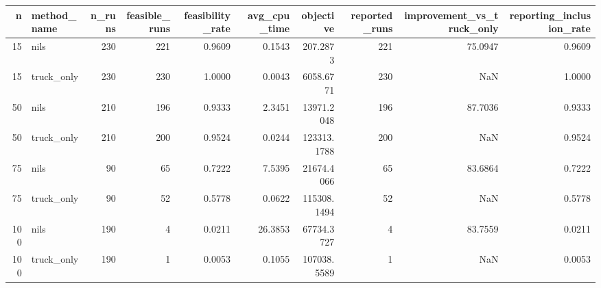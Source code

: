 \begin{tabular}{rlrrrrrrrr}
\toprule
n & method_name & n_runs & feasible_runs & feasibility_rate & avg_cpu_time & objective & reported_runs & improvement_vs_truck_only & reporting_inclusion_rate \\
\midrule
15 & nils & 230 & 221 & 0.9609 & 0.1543 & 207.2873 & 221 & 75.0947 & 0.9609 \\
15 & truck_only & 230 & 230 & 1.0000 & 0.0043 & 6058.6771 & 230 & NaN & 1.0000 \\
50 & nils & 210 & 196 & 0.9333 & 2.3451 & 13971.2048 & 196 & 87.7036 & 0.9333 \\
50 & truck_only & 210 & 200 & 0.9524 & 0.0244 & 123313.1788 & 200 & NaN & 0.9524 \\
75 & nils & 90 & 65 & 0.7222 & 7.5395 & 21674.4066 & 65 & 83.6864 & 0.7222 \\
75 & truck_only & 90 & 52 & 0.5778 & 0.0622 & 115308.1494 & 52 & NaN & 0.5778 \\
100 & nils & 190 & 4 & 0.0211 & 26.3853 & 67734.3727 & 4 & 83.7559 & 0.0211 \\
100 & truck_only & 190 & 1 & 0.0053 & 0.1055 & 107038.5589 & 1 & NaN & 0.0053 \\
\bottomrule
\end{tabular}
